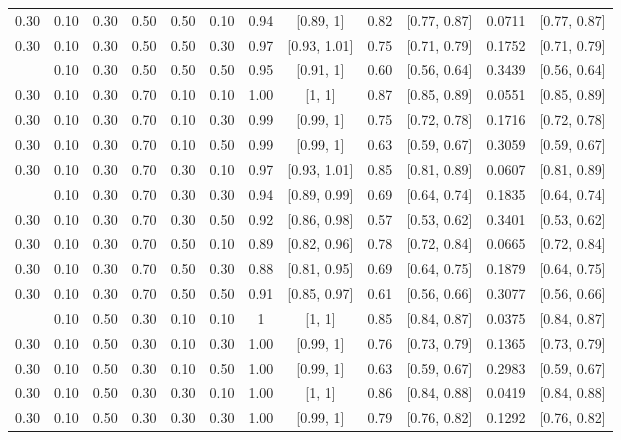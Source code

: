 \documentclass[
  11pt,
]{article}
\begin{document}
\begin{landscape}
\begin{ThreePartTable}
\begin{longtable}[t]{cccccccccccc}
0.30 & 0.10 & 0.30 & 0.50 & 0.50 & 0.10 & 0.94 & {}[0.89, 1] & 0.82 & {}[0.77, 0.87] & 0.0711 & {}[0.77, 0.87]\\
0.30 & 0.10 & 0.30 & 0.50 & 0.50 & 0.30 & 0.97 & {}[0.93, 1.01] & 0.75 & {}[0.71, 0.79] & 0.1752 & {}[0.71, 0.79]\\
\addlinespace
0.30 & 0.10 & 0.30 & 0.50 & 0.50 & 0.50 & 0.95 & {}[0.91, 1] & 0.60 & {}[0.56, 0.64] & 0.3439 & {}[0.56, 0.64]\\
0.30 & 0.10 & 0.30 & 0.70 & 0.10 & 0.10 & 1.00 & {}[1, 1] & 0.87 & {}[0.85, 0.89] & 0.0551 & {}[0.85, 0.89]\\
0.30 & 0.10 & 0.30 & 0.70 & 0.10 & 0.30 & 0.99 & {}[0.99, 1] & 0.75 & {}[0.72, 0.78] & 0.1716 & {}[0.72, 0.78]\\
0.30 & 0.10 & 0.30 & 0.70 & 0.10 & 0.50 & 0.99 & {}[0.99, 1] & 0.63 & {}[0.59, 0.67] & 0.3059 & {}[0.59, 0.67]\\
0.30 & 0.10 & 0.30 & 0.70 & 0.30 & 0.10 & 0.97 & {}[0.93, 1.01] & 0.85 & {}[0.81, 0.89] & 0.0607 & {}[0.81, 0.89]\\
\addlinespace
0.30 & 0.10 & 0.30 & 0.70 & 0.30 & 0.30 & 0.94 & {}[0.89, 0.99] & 0.69 & {}[0.64, 0.74] & 0.1835 & {}[0.64, 0.74]\\
0.30 & 0.10 & 0.30 & 0.70 & 0.30 & 0.50 & 0.92 & {}[0.86, 0.98] & 0.57 & {}[0.53, 0.62] & 0.3401 & {}[0.53, 0.62]\\
0.30 & 0.10 & 0.30 & 0.70 & 0.50 & 0.10 & 0.89 & {}[0.82, 0.96] & 0.78 & {}[0.72, 0.84] & 0.0665 & {}[0.72, 0.84]\\
0.30 & 0.10 & 0.30 & 0.70 & 0.50 & 0.30 & 0.88 & {}[0.81, 0.95] & 0.69 & {}[0.64, 0.75] & 0.1879 & {}[0.64, 0.75]\\
0.30 & 0.10 & 0.30 & 0.70 & 0.50 & 0.50 & 0.91 & {}[0.85, 0.97] & 0.61 & {}[0.56, 0.66] & 0.3077 & {}[0.56, 0.66]\\
\addlinespace
0.30 & 0.10 & 0.50 & 0.30 & 0.10 & 0.10 & 1 & {}[1, 1] & 0.85 & {}[0.84, 0.87] & 0.0375 & {}[0.84, 0.87]\\
0.30 & 0.10 & 0.50 & 0.30 & 0.10 & 0.30 & 1.00 & {}[0.99, 1] & 0.76 & {}[0.73, 0.79] & 0.1365 & {}[0.73, 0.79]\\
0.30 & 0.10 & 0.50 & 0.30 & 0.10 & 0.50 & 1.00 & {}[0.99, 1] & 0.63 & {}[0.59, 0.67] & 0.2983 & {}[0.59, 0.67]\\
0.30 & 0.10 & 0.50 & 0.30 & 0.30 & 0.10 & 1.00 & {}[1, 1] & 0.86 & {}[0.84, 0.88] & 0.0419 & {}[0.84, 0.88]\\
0.30 & 0.10 & 0.50 & 0.30 & 0.30 & 0.30 & 1.00 & {}[0.99, 1] & 0.79 & {}[0.76, 0.82] & 0.1292 & {}[0.76, 0.82]\\

\end{longtable}
\end{ThreePartTable}
\end{landscape}
\end{document}
